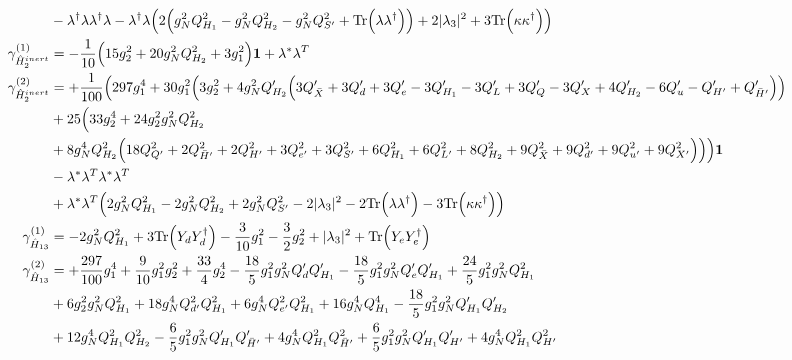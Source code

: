 {\begin{align}
 &- {\lambda^{\dagger}  \lambda  \lambda^{\dagger}  \lambda} - {\lambda^{\dagger}  \lambda} \Big(2 \Big(g_{N}^{2} Q_{H_1}^{2}  - g_{N}^{2} Q_{H_2}^{2}  - g_{N}^{2} Q_{S'}^{2}  + \mbox{Tr}\Big({\lambda  \lambda^{\dagger}}\Big)\Big) + 2 |\lambda_3|^2  + 3 \mbox{Tr}\Big({\kappa  \kappa^{\dagger}}\Big) \Big)\\ 
\gamma_{\hat{H}^{inert}_{2}}^{(1)} & =  
-\frac{1}{10} \Big(15 g_{2}^{2}  + 20 g_{N}^{2} Q_{H_2}^{2}  + 3 g_{1}^{2} \Big){\bf 1}  + {\lambda^*  \lambda^{T}}\\ 
\gamma_{\hat{H}^{inert}_{2}}^{(2)} & =  
+\frac{1}{100} \Big(297 g_{1}^{4} +30 g_{1}^{2} \Big(3 g_{2}^{2}  + 4 g_{N}^{2} Q_{H_2}' \Big(3 Q_{\bar{X}}'  + 3 Q_d'  + 3 Q_e'  -3 Q_{H_1}'  -3 Q_L'  + 3 Q_Q'  -3 Q_X'  + 4 Q_{H_2}'  -6 Q_u'  - Q_{H'}'  + Q_{\bar{H}'}'\Big)\Big)\nonumber \\ 
 &+25 \Big(33 g_{2}^{4} +24 g_{2}^{2} g_{N}^{2} Q_{H_2}^{2} \nonumber \\ 
 &+8 g_{N}^{4} Q_{H_2}^{2} \Big(18 Q_{Q'}^{2}  + 2 Q_{\bar{H}'}^{2}  + 2 Q_{H'}^{2}  + 3 Q_{e'}^{2}  + 3 Q_{S'}^{2}  + 6 Q_{H_1}^{2}  + 6 Q_{L'}^{2}  + 8 Q_{H_2}^{2}  + 9 Q_{\bar{X}}^{2}  + 9 Q_{d'}^{2}  + 9 Q_{u'}^{2}  + 9 Q_{X'}^{2} \Big)\Big)\Big){\bf 1} \nonumber \\ 
 &- {\lambda^*  \lambda^{T}  \lambda^*  \lambda^{T}} \nonumber \\ 
 &+{\lambda^*  \lambda^{T}} \Big(2 g_{N}^{2} Q_{H_1}^{2}  -2 g_{N}^{2} Q_{H_2}^{2}  + 2 g_{N}^{2} Q_{S'}^{2}  -2 |\lambda_3|^2  -2 \mbox{Tr}\Big({\lambda  \lambda^{\dagger}}\Big)  -3 \mbox{Tr}\Big({\kappa  \kappa^{\dagger}}\Big) \Big)\\ 
\gamma_{\hat{H}_{13}}^{(1)} & =  
-2 g_{N}^{2} Q_{H_1}^{2}  + 3 \mbox{Tr}\Big({Y_d  Y_{d}^{\dagger}}\Big)  -\frac{3}{10} g_{1}^{2}  -\frac{3}{2} g_{2}^{2}  + |\lambda_3|^2 + \mbox{Tr}\Big({Y_e  Y_{e}^{\dagger}}\Big)\\ 
\gamma_{\hat{H}_{13}}^{(2)} & =  
+\frac{297}{100} g_{1}^{4} +\frac{9}{10} g_{1}^{2} g_{2}^{2} +\frac{33}{4} g_{2}^{4} -\frac{18}{5} g_{1}^{2} g_{N}^{2} Q_d' Q_{H_1}' -\frac{18}{5} g_{1}^{2} g_{N}^{2} Q_e' Q_{H_1}' +\frac{24}{5} g_{1}^{2} g_{N}^{2} Q_{H_1}^{2} \nonumber \\ 
 &+6 g_{2}^{2} g_{N}^{2} Q_{H_1}^{2} +18 g_{N}^{4} Q_{d'}^{2} Q_{H_1}^{2} +6 g_{N}^{4} Q_{e'}^{2} Q_{H_1}^{2} +16 g_{N}^{4} Q_{H_1}^{4} -\frac{18}{5} g_{1}^{2} g_{N}^{2} Q_{H_1}' Q_{H_2}' \nonumber \\ 
 &+12 g_{N}^{4} Q_{H_1}^{2} Q_{H_2}^{2} -\frac{6}{5} g_{1}^{2} g_{N}^{2} Q_{H_1}' Q_{\bar{H}'}' +4 g_{N}^{4} Q_{H_1}^{2} Q_{\bar{H}'}^{2} +\frac{6}{5} g_{1}^{2} g_{N}^{2} Q_{H_1}' Q_{H'}' +4 g_{N}^{4} Q_{H_1}^{2} Q_{H'}^{2} \nonumber \\ 

\end{align}}
